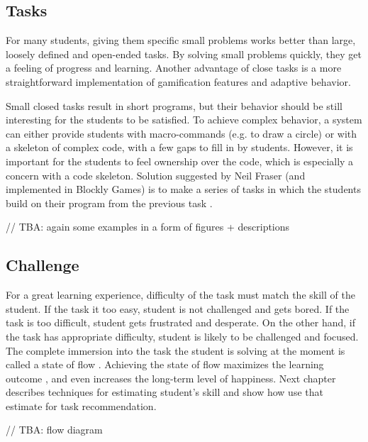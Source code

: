 \subsection{Tasks}
\label{sec:motivation.tasks}
For many students, giving them specific small problems works better
  than large, loosely defined and open-ended tasks.
By solving small problems quickly,
  they get a feeling of progress and learning.
Another advantage of close tasks
  is a more straightforward implementation of gamification features and adaptive behavior.

Small closed tasks result in short programs,
  but their behavior should be still interesting for the students to be satisfied.
To achieve complex behavior,
  a system can either provide students with macro-commands (e.g. to draw a circle)
  or with a skeleton of complex code, with a few gaps to fill in by students.
However, it is important for the students to feel ownership over the code,
  which is especially a concern with a code skeleton.
Solution suggested by Neil Fraser (and implemented in Blockly Games)
  is to make a series of tasks in which the students
  build on their program from the previous task
  \cite{blockly-10-things}.

// TBA: again some examples in a form of figures + descriptions



\subsection{Challenge}
\label{sec:motivation.challenge}
For a great learning experience,
  difficulty of the task must match the skill of the student.
If the task it too easy,
  student is not challenged and gets bored.
If the task is too difficult,
  student gets frustrated and desperate.
On the other hand, if the task has appropriate difficulty,
  student is likely to be challenged and focused.
The complete immersion into the task the student is solving at the moment is called
  a state of flow \cite{flow}.
Achieving the state of flow maximizes the learning outcome \cite{adaptive-practice},
  and even increases the long-term level of happiness. %
Next chapter describes techniques for estimating student’s skill
  and show how use that estimate for task recommendation.

// TBA: flow diagram

